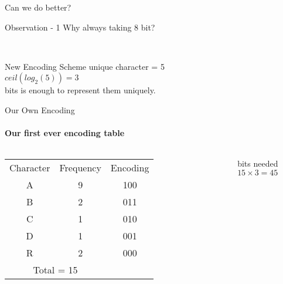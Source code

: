 \begin{frame}{\centering Can we do better?}
    \begin{center}
        \begin{block}{\centering Observation - 1}
        \centering
        Why always taking 8 bit? \\[1cm]
        \end{block}\\[1cm]\pause
        \begin{exampleblock}{\centering New Encoding Scheme}
        \centering unique character = 5\\\pause
        $ceil(log_2(5)) = 3$\\ bits is enough to represent them uniquely.
        \end{exampleblock}
        
    \end{center}
\end{frame}
\begin{frame}{Our Own Encoding}
\framesubtitle{Our first ever encoding table}
    \begin{center}
         \begin{columns}
    
\begin{table}[]
\begin{tabular}{ccc}
\rowcolor[HTML]{009901} 
Character                  & Frequency                 & Encoding \pause\\ 
\rowcolor[HTML]{FE0000} 
A                          & 9                         & 100      \pause\\
\rowcolor[HTML]{F8A102} 
B                          & 2                         & 011      \pause\\
\rowcolor[HTML]{F8FF00} 
C                          & 1                         & 010      \pause\\
\rowcolor[HTML]{FCFF2F} 
D                          & 1                         & 001      \pause\\
\rowcolor[HTML]{FFCC67} 
R                          & 2                         & 000      \pause\\
\multicolumn{2}{c}{\cellcolor[HTML]{FFFFFF}Total = 15} &         
\end{tabular}
\end{table}
    \pause 
    \begin{exampleblock}{\centering bits needed}
       \centering $15  \times 3 = 45$
    \end{exampleblock}
    \end{columns}
    \end{center}
\end{frame}
